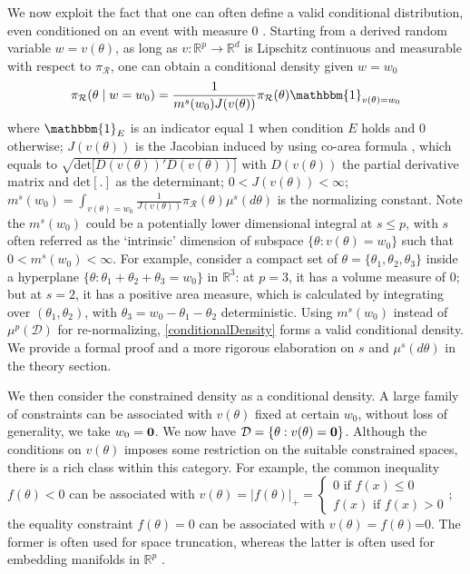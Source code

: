 \documentclass[10pt,fleqn]{article}
\newcommand{\be}{\begin{equation}\begin{aligned}}
\newcommand{\ee}{\end{aligned}\end{equation}}
\newcommand{\bb}[1]{\mathbb{#1}}
\newcommand{\mc}[1]{\mathcal{#1}}
\DeclareMathOperator{\1}{\mathbbm{1}}
\begin{document}
We now exploit the fact that one can often define a valid conditional distribution,
even conditioned on an event with measure $0$ \citep{kolmogorov1950foundations}.
Starting from  a derived random variable $w=v(\theta)$, as long as $v:\bb R^p\rightarrow \bb R^d$ is  Lipschitz
continuous and measurable with respect to $\pi_{\mc R}$, one can obtain a conditional density given $w=w_0$ 
\be
\label{conditionalDensity}
\pi_{\mc R}(\theta \mid w=w_0) = \frac{1}{m^s(w_0) J(v(\theta))} \pi_{\mc R}(\theta) \mathbbm{1}_{v(\theta)=w_0}
\ee
where $\mathbbm{1}_{E}$ is an indicator equal $1$ when condition
$E$ holds and $0$ otherwise; $J(v(\theta))$ is the Jacobian induced by using
co-area formula \citep{federer2014geometric}, which equals to
$\sqrt{\mbox{det[}D(v(\theta))'
D(v(\theta))]}$ with $D(v(\theta))$ the partial derivative matrix and $\text{det}[.]$
as the determinant; $0<J(v(\theta))<\infty$; $m^s(w_0)=\int_{v(\theta)=w_0} \frac{1}{J(v(\theta))} \pi_{\mc R}(\theta) \mu^s(d\theta) $ is the normalizing constant. Note the $m^s(w_0)$  could be a potentially lower dimensional integral at  $s\le p$, with
$s$ often referred as the `intrinsic' dimension of subspace $\{\theta: v(\theta)=w_0\}$
such that   $0<m^s(w_0)<\infty$.  For example, consider a compact set of $\theta=\{\theta_1,\theta_2,\theta_3\}$ inside a
hyperplane $\{\theta: \theta_1+\theta_2+\theta_3=w_0\}$ in $\bb R^3$: at $p=3$, it has a volume measure of $0$;  but at $s=2$, it has a  positive area measure, which is calculated by integrating over $(\theta_1,\theta_2)$, with $\theta_3=w_0-\theta_1-\theta_2$ deterministic. Using $m^s(w_0)$
instead of $\mu^p(\mc D)$ for re-normalizing, \eqref{conditionalDensity} forms a valid conditional density. We provide a formal proof and a more rigorous elaboration on  $s$ and $\mu^s(d\theta)$  
in the theory section.

We then consider the constrained density as a conditional density. A large family of constraints can be
associated with $v(\theta)$ fixed at certain $w_0$, without
loss of generality, we take $w_0=\bf 0$. We now have
 $\mc D =\{\theta:
v(\theta)={\bf 0}\}$. Although the conditions on $v(\theta)$ imposes some
restriction  on the suitable constrained spaces, there is a rich class within this category.
For example, the common  inequality $f(\theta)<0$ can be associated with $v(\theta)=|f(\theta)|_+=\left\{\begin{array}{cc}  0 \text{ if } f(x)\le 0
\\ f(x) \text{ if } f(x)> 0\end{array}\right.$; the 
equality constraint $f(\theta)=0$ can be associated with $v(\theta)=f(\theta)$=0. The former is often used for space truncation, whereas the latter is often used for  embedding manifolds   in $\bb R^p$ \citep{do2016differential}. 
\end{document}
